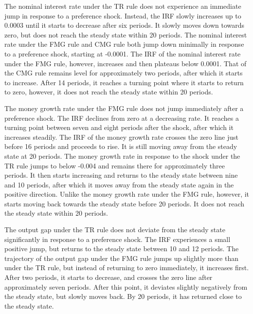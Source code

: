 \documentclass[11pt,preprint, authoryear]{elsarticle}
\numberwithin{equation}{section}
\numberwithin{figure}{section}
\numberwithin{table}{section}
\begin{document}
The nominal interest rate under the TR rule does not experience an
immediate jump in response to a preference shock. Instead, the IRF
slowly increases up to 0.0003 until it starts to decrease after six
periods. It slowly moves down towards zero, but does not reach the
steady state within 20 periods. The nominal interest rate under the FMG
rule and CMG rule both jump down minimally in response to a preference
shock, starting at -0.0001. The IRF of the nominal interest rate under
the FMG rule, however, increases and then plateaus below 0.0001. That of
the CMG rule remains level for approximately two periods, after which it
starts to increase. After 14 periods, it reaches a turning point where
it starts to return to zero, however, it does not reach the steady state
within 20 periods.

The money growth rate under the FMG rule does not jump immediately after
a preference shock. The IRF declines from zero at a decreasing rate. It
reaches a turning point between seven and eight periods after the shock,
after which it increases steadily. The IRF of the money growth rate
crosses the zero line just before 16 periods and proceeds to rise. It is
still moving away from the steady state at 20 periods. The money growth
rate in response to the shock under the TR rule jumps to below -0.004
and remains there for approximately three periods. It then starts
increasing and returns to the steady state between nine and 10 periods,
after which it moves away from the steady state again in the positive
direction. Unlike the money growth rate under the FMG rule, however, it
starts moving back towards the steady state before 20 periods. It does
not reach the steady state within 20 periods.

The output gap under the TR rule does not deviate from the steady state
significantly in response to a preference shock. The IRF experiences a
small positive jump, but returns to the steady state between 10 and 12
periods. The trajectory of the output gap under the FMG rule jumps up
slightly more than under the TR rule, but instead of returning to zero
immediately, it increases first. After two periods, it starts to
decrease, and crosses the zero line after approximately seven periods.
After this point, it deviates slightly negatively from the steady state,
but slowly moves back. By 20 periods, it has returned close to the
steady state.
\end{document}
